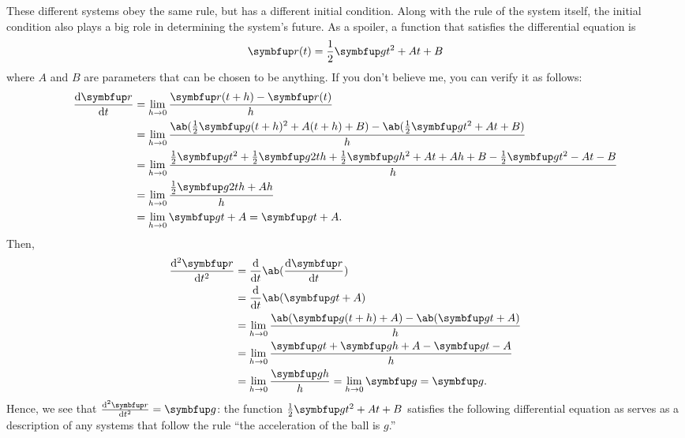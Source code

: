 These different systems obey the same rule, but has a different initial condition. Along with the rule of the system itself, the initial condition also plays a big role in determining the system's future. As a spoiler, a function that satisfies the differential equation is
\begin{equation}
  \vv{r}(t) = \frac{1}{2}\vv{g}t^2 + At + B
\end{equation}
where \(A\) and \(B\) are parameters that can be chosen to be anything. If you don't believe me, you can verify it as follows:
\begin{align}
  \odv{\vv{r}}{t}
   & = \lim_{h \appr 0} \frac{\vv{r}(t + h) - \vv{r}(t)}{h}                                                           \\
   & = \lim_{h \appr 0} \frac{\ab(\frac{1}{2}\vv{g}(t + h)^2 + A(t + h) + B) - \ab(\frac{1}{2}\vv{g}t^2 + At + B)}{h} \\
   & = \lim_{h \appr 0} \frac{                                                                                        %
    \frac{1}{2}\vv{g}t^2 + \frac{1}{2}\vv{g}2th + \frac{1}{2}\vv{g}h^2 + At + Ah + B -
    \frac{1}{2}\vv{g}t^2 - At - B%
  }{h}                                                                                                                \\
   & = \lim_{h \appr 0} \frac{\frac{1}{2}\vv{g}2th + Ah}{h}                                                           \\
   & = \lim_{h \appr 0} \vv{g}t + A = \vv{g}t + A. \label{eq:derivatives-ex1}
\end{align}
Then,
\begin{align}
  \odv[ord = 2]{\vv{r}}{t}
   & = \odv*{\ab(\odv{\vv{r}}{t})}{t}                                          \\
   & = \odv*{\ab(\vv{g}t + A)}{t}                                              \\
   & = \lim_{h \appr 0} \frac{\ab(\vv{g}(t + h) + A) - \ab(\vv{g}t + A)}{h}    \\
   & = \lim_{h \appr 0} \frac{\vv{g}t + \vv{g}h + A - \vv{g}t - A}{h}          \\
   & = \lim_{h \appr 0} \frac{\vv{g}h}{h} = \lim_{h \appr 0} \vv{g} = \vv{g}.
\end{align}
Hence, we see that \(\odv[ord = 2]{\vv{r}}{t} = \vv{g}\): the function \(\frac{1}{2}\vv{g}t^2 + At + B\) satisfies the following differential equation as serves as a description of any systems that follow the rule \enquote{the acceleration of the ball is \(g\).}

